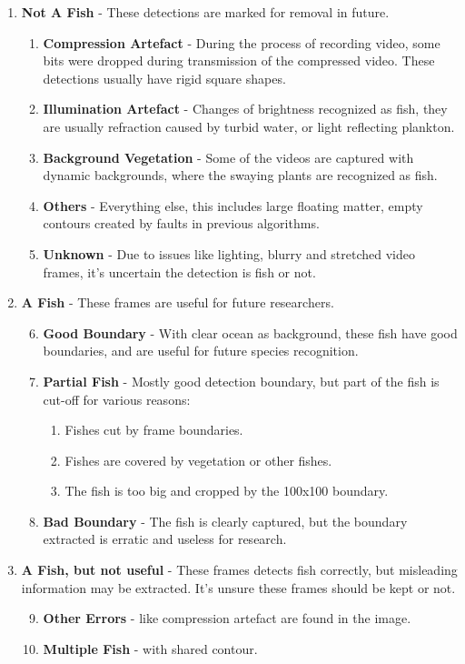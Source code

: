 \documentclass[bsc,logo,twoside,fullspacing,parskip]{infthesis}
\begin{document}
\begin{enumerate}
   \setlength{\parskip}{3pt}

 \item \textbf{Not A Fish} - These detections are marked for removal in future.
 \begin{enumerate}
   \item \textbf{Compression Artefact} - During the process of recording video, some bits were dropped during transmission of the compressed video. These detections usually have rigid square shapes.
   \item \textbf{Illumination Artefact} - Changes of brightness recognized as fish, they are usually refraction caused by turbid water, or light reflecting plankton.
   \item \textbf{Background Vegetation} - Some of the videos are captured with dynamic backgrounds, where the swaying plants are recognized as fish.
   \item \textbf{Others} - Everything else, this includes large floating matter, empty contours created by faults in previous algorithms.
   \item \textbf{Unknown} - Due to issues like lighting, blurry and stretched video frames, it's uncertain the detection is fish or not.
 \end{enumerate}
 
 \item \textbf{A Fish} - These frames are useful for future researchers.
 \begin{enumerate}
   \setcounter{enumii}{5} 
   \item \textbf{Good Boundary} - With clear ocean as background, these fish have good boundaries, and are useful for future species recognition.
   \item \textbf{Partial Fish} - Mostly good detection boundary, but part of the fish is cut-off for various reasons:
    \begin{enumerate}
      \item Fishes cut by frame boundaries.
      \item Fishes are covered by vegetation or other fishes.
      \item The fish is too big and cropped by the 100x100 boundary.
    \end{enumerate}
   \item \textbf{Bad Boundary} - The fish is clearly captured, but the boundary extracted is erratic and useless for research. 
 \end{enumerate}
 
 \item \textbf{A Fish, but not useful} - These frames detects fish correctly, but misleading information may be extracted. It's unsure these frames should be kept or not.
 \begin{enumerate}
   \setcounter{enumii}{8} 
   \item \textbf{Other Errors} - like compression artefact are found in the image.
   \item \textbf{Multiple Fish} - with shared contour.
 \end{enumerate}
\end{enumerate}
\end{document}
